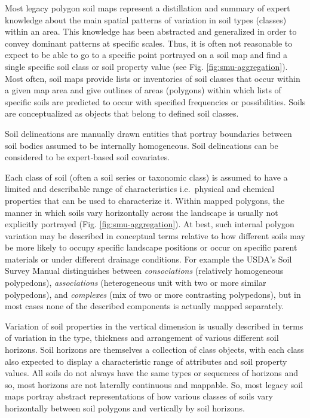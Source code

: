 \documentclass[graybox,natbib,nospthms,UStrade]{svmono}
\let\BeginKnitrBlock\begin \let\EndKnitrBlock\end
\let\BeginKnitrBlock\begin \let\EndKnitrBlock\end
\begin{document}
Most legacy polygon soil maps represent a distillation and summary of
expert knowledge about the main spatial patterns of variation in soil
types (classes) within an area. This knowledge has been abstracted and
generalized in order to convey dominant patterns at specific scales.
Thus, it is often not reasonable to expect to be able to go to a
specific point portrayed on a soil map and find a single specific soil
class or soil property value (see Fig. \ref{fig:smu-aggregation}). Most
often, soil maps provide lists or inventories of soil classes that occur
within a given map area and give outlines of areas (polygons) within
which lists of specific soils are predicted to occur with specified
frequencies or possibilities. Soils are conceptualized as objects that
belong to defined soil classes.

\BeginKnitrBlock{rmdnote}
Soil delineations are manually drawn
entities that portray boundaries between soil bodies assumed to be
internally homogeneous. Soil delineations can be considered to be
expert-based soil covariates.
\EndKnitrBlock{rmdnote}

Each class of soil (often a soil series or taxonomic class) is assumed
to have a limited and describable range of characteristics i.e.~physical
and chemical properties that can be used to characterize it. Within
mapped polygons, the manner in which soils vary horizontally across the
landscape is usually not explicitly portrayed
(Fig. \ref{fig:smu-aggregation}). At best, such internal polygon
variation may be described in conceptual terms relative to how different
soils may be more likely to occupy specific landscape positions or occur
on specific parent materials or under different drainage conditions. For
example the USDA's Soil Survey Manual distinguishes between
\emph{consociations} (relatively homogeneous polypedons), \emph{associations}
(heterogeneous unit with two or more similar polypedons), and
\emph{complexes} (mix of two or more contrasting polypedons), but in most
cases none of the described components is actually mapped separately.

Variation of soil properties in the vertical dimension is usually
described in terms of variation in the type, thickness and arrangement
of various different soil horizons. Soil horizons are themselves a
collection of class objects, with each class also expected to display a
characteristic range of attributes and soil property values. All soils
do not always have the same types or sequences of horizons and so, most
horizons are not laterally continuous and mappable. So, most legacy soil
maps portray abstract representations of how various classes of soils
vary horizontally between soil polygons and vertically by soil horizons.
\end{document}
